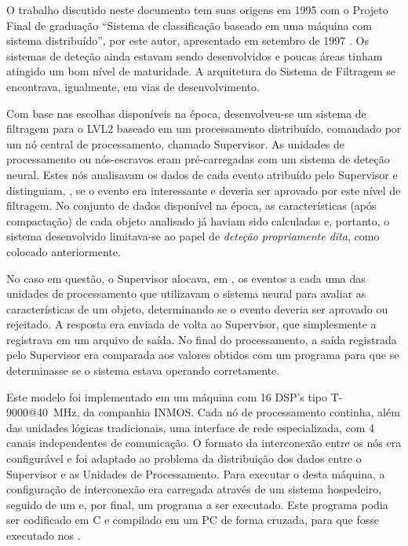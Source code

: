 O trabalho discutido neste documento tem suas origens em 1995 com o Projeto
Final de graduação ``Sistema de classificação baseado em uma máquina com
sistema distribuído'', por este autor, apresentado em setembro de 1997
\cite{aa:projeto-final}. Os sistemas de deteção ainda estavam sendo
desenvolvidos e poucas áreas tinham atingido um bom nível de maturidade. A
arquitetura do Sistema de Filtragem se encontrava, igualmente, em vias de
desenvolvimento.

Com base nas escolhas disponíveis na época, desenvolveu-se um sistema de
filtragem para o LVL2 baseado em um processamento distribuído, comandado por
um nó central de processamento, chamado Supervisor. As unidades de
processamento ou nós-escravos eram pré-carregadas com um sistema de deteção
neural. Estes nós analisavam os dados de cada evento atribuído pelo Supervisor
e distinguiam, , se o evento era interessante e deveria ser
aprovado por este nível de filtragem. No conjunto de dados disponível na
época, as características (após compactação) de cada objeto analisado já
haviam sido calculadas e, portanto, o sistema desenvolvido limitava-se ao papel
de \textit{deteção propriamente dita}, como colocado anteriormente.

No caso em questão, o Supervisor alocava, em , os eventos a
cada uma das unidades de processamento que utilizavam o sistema neural para
avaliar as características de um objeto, determinando se o evento deveria ser
aprovado ou rejeitado. A resposta era enviada de volta ao Supervisor, que
simplesmente a registrava em um arquivo de saída. No final do processamento, a
saída registrada pelo Supervisor era comparada aos valores obtidos com um
programa  para que se determinasse se o sistema estava operando
corretamente.

Este modelo foi implementado em um máquina com 16 DSP's tipo T-9000@40~MHz, da
companhia INMOS. Cada nó de processamento continha, além das unidades lógicas
tradicionais, uma interface de rede especializada, com 4 canais independentes
de comunicação. O formato da interconexão entre os nós era configurável e foi
adaptado ao problema da distribuição dos dados entre o Supervisor e as
Unidades de Processamento. Para executar o  desta máquina, a
configuração de interconexão era carregada através de um sistema hospedeiro,
seguido de um  e, por final, um programa a ser
executado. Este programa podia ser codificado em C e compilado em um PC de
forma cruzada, para que fosse executado nos
.

